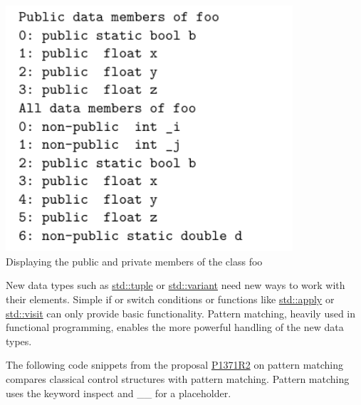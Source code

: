 \begin{center}
\includegraphics[width=0.8\textwidth]{content/5/chapter8/images/8.png}\\
Displaying the public and private members of the class foo
\end{center}


New data types such as \href{https://en.cppreference.com/w/cpp/utility/tuple}{std::tuple} or \href{https://en.cppreference.com/w/cpp/utility/variant}{std::variant} need new ways to work with their elements. Simple if or switch conditions or functions like \href{https://en.cppreference.com/w/cpp/utility/apply}{std::apply} or \href{https://en.cppreference.com/w/cpp/utility/variant/visit}{std::visit} can only provide basic functionality. Pattern matching, heavily used in functional programming, enables the more powerful handling of the new data types.

The following code snippets from the proposal \href{http://www.open-std.org/jtc1/sc22/wg21/docs/papers/2020/p1371r2.pdf}{P1371R2} on pattern matching compares classical control structures with pattern matching. Pattern matching uses the keyword inspect and \_\_ for a placeholder.

